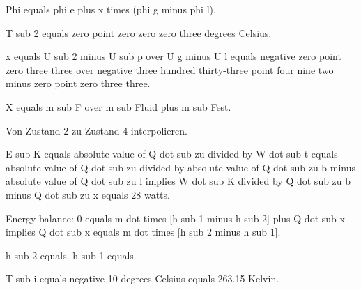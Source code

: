 Phi equals phi e plus x times (phi g minus phi l).

T sub 2 equals zero point zero zero zero three degrees Celsius.

x equals U sub 2 minus U sub p over U g minus U l equals negative zero point zero three three over negative three hundred thirty-three point four nine two minus zero point zero three three.

X equals m sub F over m sub Fluid plus m sub Fest.

Von Zustand 2 zu Zustand 4 interpolieren.

E sub K equals absolute value of Q dot sub zu divided by W dot sub t equals absolute value of Q dot sub zu divided by absolute value of Q dot sub zu b minus absolute value of Q dot sub zu l implies W dot sub K divided by Q dot sub zu b minus Q dot sub zu x equals 28 watts.

Energy balance: 0 equals m dot times [h sub 1 minus h sub 2] plus Q dot sub x implies Q dot sub x equals m dot times [h sub 2 minus h sub 1].

h sub 2 equals. h sub 1 equals.

T sub i equals negative 10 degrees Celsius equals 263.15 Kelvin.